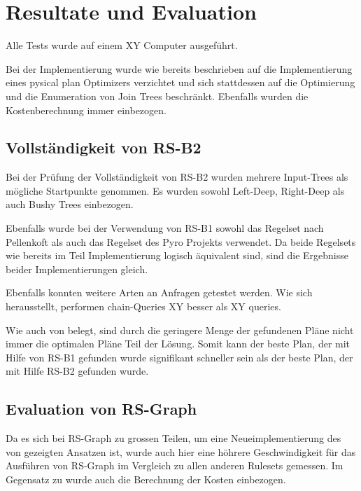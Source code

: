 \chapter{Resultate und Evaluation}

Alle Tests wurde auf einem XY Computer ausgeführt.

Bei der Implementierung wurde wie bereits beschrieben auf die Implementierung eines pysical plan Optimizers verzichtet und sich stattdessen auf die Optimierung und die Enumeration von Join Trees beschränkt. Ebenfalls wurden die Kostenberechnung immer einbezogen.

\section{Vollständigkeit von RS-B2}

Bei der Prüfung der Vollständigkeit von RS-B2 wurden mehrere Input-Trees als mögliche Startpunkte genommen. Es wurden sowohl Left-Deep, Right-Deep als auch Bushy Trees einbezogen. 

Ebenfalls wurde bei der Verwendung von RS-B1 sowohl das Regelset nach Pellenkoft als auch das Regelset des Pyro Projekts verwendet. Da beide Regelsets wie bereits im Teil Implementierung logisch äquivalent sind, sind die Ergebnisse beider Implementierungen gleich.

Ebenfalls konnten weitere Arten an Anfragen getestet werden. Wie sich herausstellt, performen chain-Queries XY besser als XY queries.


Wie auch von \cite{XY} belegt, sind durch die geringere Menge der gefundenen Pläne nicht immer die optimalen Pläne Teil der Lösung. Somit kann der beste Plan, der mit Hilfe von RS-B1 gefunden wurde signifikant schneller sein als der beste Plan, der mit Hilfe RS-B2 gefunden wurde. 


\section{Evaluation von RS-Graph}

Da es sich bei RS-Graph zu grossen Teilen, um eine Neueimplementierung des von \cite{Moerkotte} gezeigten Ansatzen ist, wurde auch hier eine höhrere Geschwindigkeit für das Ausführen von RS-Graph im Vergleich zu allen anderen Rulesets  gemessen. Im Gegensatz zu \cite{} wurde auch die Berechnung der Kosten einbezogen. 